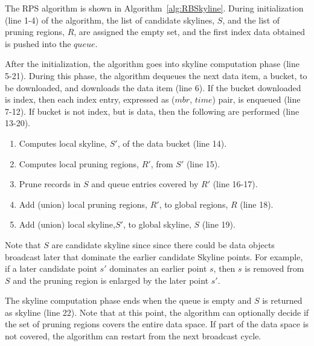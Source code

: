 The RPS algorithm is shown in Algorithm~\ref{alg:RBSkyline}. During initialization (line 1-4) of the algorithm, the list of candidate skylines, $S$, and the list of pruning regions, $R$, are assigned the empty set, and the first index data obtained is pushed into the $queue$.

After the initialization, the algorithm goes into skyline computation phase (line 5-21). During this phase, the algorithm dequeues the next data item, a bucket, to be downloaded, and downloads the data item (line 6). If the bucket downloaded is index, then each index entry, expressed as ($mbr$, $time$) pair, is enqueued (line 7-12). If bucket is not index, but is data, then the following are performed (line 13-20).

\begin{enumerate}
\item Computes local skyline, $S'$, of the data bucket (line 14).
\item Computes local pruning regions, $R'$, from $S'$ (line 15).
\item Prune records in $S$ and queue entries covered by $R'$ (line 16-17).
\item Add (union) local pruning regions, $R'$, to global regions, $R$ (line 18).
\item Add (union) local skyline,$S'$, to global skyline, $S$ (line 19).
\end{enumerate}

Note that $S$ are candidate skyline since since there could be data objects broadcast later that dominate the earlier candidate Skyline points. For example, if a later candidate point $s'$ dominates an earlier point $s$, then $s$ is removed from $S$ and the pruning region is enlarged by the later point $s'$.

The skyline computation phase ends when the queue is empty and $S$ is returned as skyline (line 22). Note that at this point, the algorithm can optionally decide if the set of pruning regions covers the entire data space. If part of the data space is not covered, the algorithm can restart from the next broadcast cycle.

